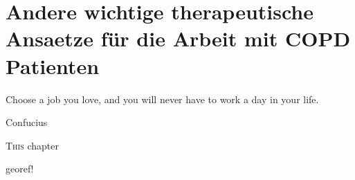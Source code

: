 \chapter{Andere wichtige therapeutische Ansaetze für die Arbeit mit COPD Patienten}
\label{chapter:andere_wichtige_therapeutische_ansaetze_für_die_arbeit_mit_copd_patienten}
\epigraph{Choose a job you love, and you will never have to work a day in your life.}{Confucius}

\ifpdf
    \graphicspath{{4_segmentation/figures/PNG/}{4_andere_wichtige_therapeutische_ansaetze_für_die_arbeit_mit_copd_patienten/figures/PDF/}{4_andere_wichtige_therapeutische_ansaetze_für_die_arbeit_mit_copd_patienten/figures/}}
\else
    \graphicspath{{4_andere_wichtige_therapeutische_ansaetze_für_die_arbeit_mit_copd_patienten/figures/EPS/}{4_andere_wichtige_therapeutische_ansaetze_für_die_arbeit_mit_copd_patienten/figures/}}
\fi

\lettrine{T}{his} chapter 


georef!